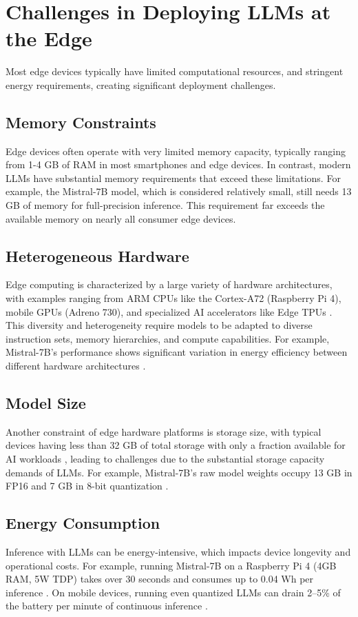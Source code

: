 \documentclass[11pt]{IEEEtran}
\begin{document}
\section{Challenges in Deploying LLMs at the Edge}
Most edge devices typically have limited computational resources, and stringent energy requirements, creating significant deployment challenges. 

\subsection{Memory Constraints}
Edge devices often operate with very limited memory capacity, typically ranging from 1-4 GB of RAM \cite{b54} in most smartphones and edge devices. In contrast, modern LLMs have substantial memory requirements that exceed these limitations. For example, the Mistral-7B model, which is considered relatively small, still needs 13 GB of memory for full-precision inference. This requirement far exceeds the available memory on nearly all consumer edge devices.

\subsection{Heterogeneous Hardware}
Edge computing is characterized by a large variety of hardware architectures, with examples ranging from ARM CPUs like the Cortex-A72 (Raspberry Pi 4), mobile GPUs (Adreno 730), and specialized AI accelerators like Edge TPUs \cite{b55}. This diversity and heterogeneity require models to be adapted to diverse instruction sets, memory hierarchies, and compute capabilities. For example, Mistral-7B's performance shows significant variation in energy efficiency between different hardware architectures \cite{b56}.

\subsection{Model Size}
Another constraint of edge hardware platforms is storage size, with typical devices having less than 32 GB of total storage with only a fraction available for AI workloads \cite{b54}, leading to challenges due to the substantial storage capacity demands of LLMs. For example, Mistral-7B's raw model weights occupy 13 GB in FP16 and 7 GB in 8-bit quantization \cite{b52}.

\subsection{Energy Consumption}
Inference with LLMs can be energy-intensive, which impacts device longevity and operational costs. For example, running Mistral-7B on a Raspberry Pi 4 (4GB RAM, 5W TDP) takes over 30 seconds and consumes up to 0.04 Wh per inference \cite{b57}. On mobile devices, running even quantized LLMs can drain 2–5\% of the battery per minute of continuous inference \cite{b58}. 
\end{document}
